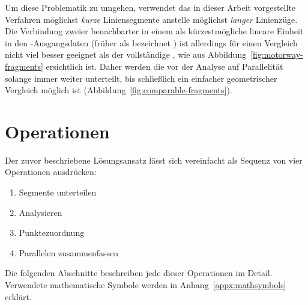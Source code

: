 \documentclass[../main/thesis.tex]{subfiles}
\begin{document}
Um diese Problematik zu umgehen, verwendet das in dieser Arbeit vorgestellte Verfahren möglichst \emph{kurze} Liniensegmente anstelle möglichst \emph{langer} Linienzüge.
Die Verbindung zweier benachbarter  in einem  als kürzestmögliche lineare Einheit in den \osm-Ausgangsdaten (früher als  bezeichnet ) ist allerdings für einen Vergleich nicht viel besser geeignet als der vollständige %
, wie aus Abbildung~\ref{fig:motorway-fragments} ersichtlich ist.
Daher werden die  vor der Analyse auf Parallelität solange immer weiter unterteilt, bis schließlich ein einfacher geometrischer Vergleich möglich ist (Abbildung~\ref{fig:comparable-fragments}).




\section{Operationen}
\label{ch:algorithm-parts}

Der zuvor beschriebene Lösungsansatz lässt sich vereinfacht als Sequenz von vier Operationen ausdrücken:
\begin{enumerate}[nosep]
	\item Segmente unterteilen
	\item Analysieren
	\item Punktezuordnung
	\item Parallelen zusammenfassen
\end{enumerate}
%
Die folgenden Abschnitte beschreiben jede dieser Operationen im Detail.
Verwendete mathematische Symbole werden in Anhang~\ref{appx:mathsymbols} erklärt.
\end{document}
